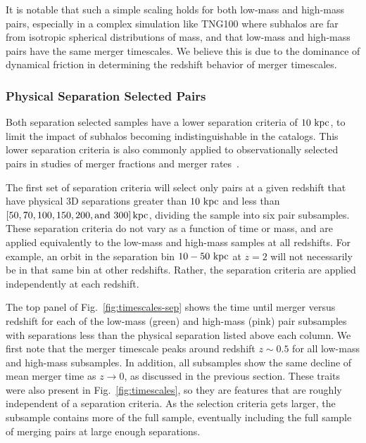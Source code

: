 \documentclass[twocolumn,linenumbers]{aastex631}
\begin{document}
        It is notable that such a simple scaling holds for both low-mass and high-mass pairs, especially in a complex simulation like TNG100 where subhalos are far from isotropic spherical distributions of mass, and that low-mass and high-mass pairs have the same merger timescales. 
        We believe this is due to the dominance of dynamical friction in determining the redshift behavior of merger timescales. 
        
            


            

    \subsubsection{Physical Separation Selected Pairs }
    \label{sec:results-phys}
        Both separation selected samples have a lower separation criteria of $10\,\mathrm{\,kpc}$, to limit the impact of subhalos becoming indistinguishable in the \subfind{} catalogs.
        This lower separation criteria is also commonly applied to observationally selected pairs in studies of merger fractions and merger rates~\citep[see e.g.][and observational studies cited therein]{Lotz2011,Snyder2017,Besla2018,Chamberlain2024}.
        
        The first set of separation criteria will select only pairs at a given redshift that have physical 3D separations greater than $10\,\mathrm{\,kpc}$ and less than $[50, 70, 100, 150, 200, \mbox{and }300]\mathrm{\,kpc}$, dividing the sample into six pair subsamples. 
        These separation criteria do not vary as a function of time or mass, and are applied equivalently to the low-mass and high-mass samples at all redshifts. 
        For example, an orbit in the separation bin $10-50\,\mathrm{\,kpc}$ at $z=2$ will not necessarily be in that same bin at other redshifts. 
        Rather, the separation criteria are applied independently at each redshift. 
        
        The top panel of Fig.~\ref{fig:timescales-sep} shows the time until merger versus redshift for each of the low-mass (green) and high-mass (pink) pair subsamples with separations less than the physical separation listed above each column.  
        We first note that the merger timescale peaks around redshift $z\sim0.5$ for all low-mass and high-mass subsamples. 
        In addition, all subsamples show the same decline of mean merger time as $z\to0$, as discussed in the previous section. 
        These traits were also present in Fig.~\ref{fig:timescales}, so they are features that are roughly independent of a separation criteria.
        As the selection criteria gets larger, the subsample contains more of the full sample, eventually including the full sample of merging pairs at large enough separations.
        
\end{document}
